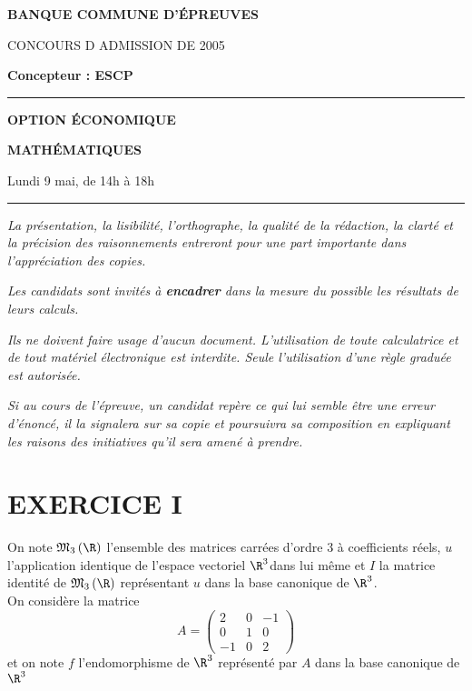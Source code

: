 \documentclass[11pt]{article}%
\begin{document}

\begin{center}
{\LARG\E\textbf{BANQUE COMMUNE D'ÉPREUVES}}



{\large \textsc{CONCOURS D ADMISSION DE 2005}}



{\large \textbf{Concepteur : ESCP}}



\rule{2.39cm}{0.05cm}



{\Large \textbf{OPTION ÉCONOMIQUE}}



{\Large \textbf{MATHÉMATIQUES }}



{\Large Lundi 9 mai, de 14h à 18h}



\rule{2.39cm}{0.05cm}
\end{center}

\textit{La présentation, la lisibilité, l'orthographe, la qualité
de la rédaction, la clarté et la précision des raisonnements
entreront pour une part importante dans l'appréciation des copies.}

\textit{Les candidats sont invités à \textbf{encadrer} dans la mesure
du possible les résultats de leurs calculs.}

\textit{Ils ne doivent faire usage d'aucun document. L'utilisation de
toute
calculatrice et de tout matériel électronique est interdite. Seule
l'utilisation d'une règle graduée est autorisée.}

\textit{Si au cours de l'épreuve, un candidat repère ce qui lui semble
être une erreur d'énoncé, il la signalera sur sa copie et
poursuivra sa composition en expliquant les raisons des initiatives
qu'il sera
amené à prendre.}

\vspace*{3cm}

\section*{EXERCICE I}

On note $\mathfrak{M}_{3}\left( \R\right) $ l'ensemble des matrices
carrées d'ordre 3 à coefficients réels, $u$ l'application identique de
l'espace vectoriel $\R^{3}$dans lui même et $I$ la matrice identité
de $\mathfrak{M}_{3}\left( \R\right) $ représentant $u$ dans la base
canonique de $\R^{3}$.\\
On considère la matrice 
\[
A = \left( 
\begin{array}{ccc}
2 & 0 & -1 \\
0 & 1 & 0 \\
-1 & 0 & 2
\end{array}
\right) 
\]
et on note $f$ l'endomorphisme de $\R^{3}$ représenté par $A$ dans
la base canonique de $\R^{3}$
\end{document}
